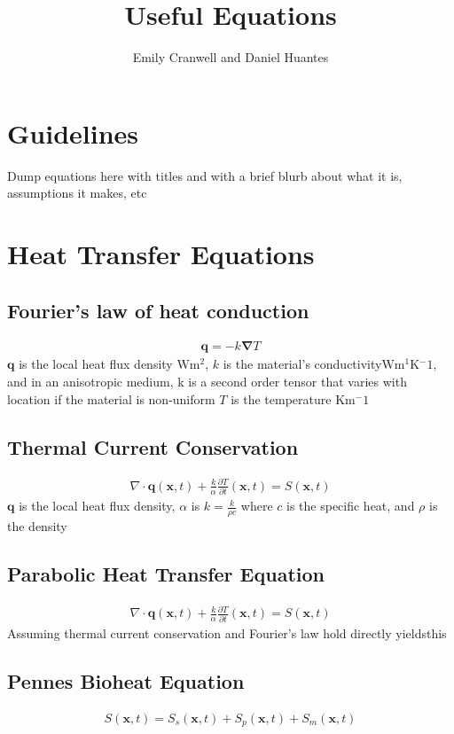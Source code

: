 \documentclass[12pt]{article}
\begin{document}
\title{Useful Equations}
\author{Emily Cranwell and Daniel Huantes}
\maketitle
\section{Guidelines}
Dump equations here with titles and with a brief blurb about what it is, assumptions it makes, etc
\section{Heat Transfer Equations}
\subsection{Fourier's law of heat conduction}
\begin{equation}
\begin{aligned}
\boldsymbol{q} = -k\boldsymbol{\nabla} T
\end{aligned}
\label{fig:FLHC}
\end{equation} 
$\boldsymbol{q}$ is the local heat flux density $\si{\watt\meter^2}$,
$k$ is the material's conductivity$\si{\watt\meter^1\kelvin^-1}$, and in an anisotropic medium, k is a second order tensor that varies with location if the material is non-uniform
$T$ is the temperature $\si{\kelvin\meter^-1}$
\subsection{Thermal Current Conservation}
\begin{equation}
\begin{aligned}
\nabla\cdot\boldsymbol{q}(\boldsymbol{x}, t) + \frac{k}{\alpha} \frac{\partial T}{\partial t}(\boldsymbol{x}, t) = S(\boldsymbol{x}, t)
\label{fig:TCC}
\end{aligned}
\end{equation}
$\boldsymbol{q}$ is the local heat flux density, $\alpha$ is 
\begin{math}
k = \frac{k}{\rho c}
\end{math}
where $c$ is the specific heat, and $\rho$ is the density
\subsection{Parabolic Heat Transfer Equation}
\begin{equation}
\begin{aligned}
\nabla\cdot\boldsymbol{q}(\boldsymbol{x}, t) + \frac{k}{\alpha} \frac{\partial T}{\partial t}(\boldsymbol{x}, t) = S(\boldsymbol{x}, t)
\label{fig:PHTE}
\end{aligned}
\end{equation}
Assuming thermal current conservation and Fourier's law hold directly yieldsthis
\subsection{Pennes Bioheat Equation}
\begin{equation}
\begin{aligned}
S(\boldsymbol{x}, t) = S_s(\boldsymbol{x}, t) + S_p(\boldsymbol{x}, t) + S_m(\boldsymbol{x}, t)
\label{fig:PBHE}
\end{aligned}
\end{equation}
\end{document}
